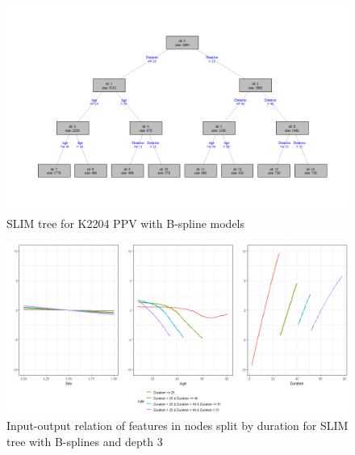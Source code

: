 \begin{figure}[!htb]
    \centering   
    \includegraphics[width = 16cm]{Figures/insurance_use_case/k2204_PPV/slim_bsplines_small_tree.png}
    \caption{SLIM tree for K2204 PPV with B-spline models}
    \label{fig:ins_k2204_ppv_slim_bsplines_tree}
\end{figure}



\begin{figure}[!htb]
    \centering
    \includegraphics[width = 16cm]{Figures/insurance_use_case/k2204_PPV/effects_duration.png}
    \caption{Input-output relation of features in nodes split by duration for SLIM tree with B-splines and depth 3}
    \label{fig:ins_k2204_ppv_effects_duration}
\end{figure}




